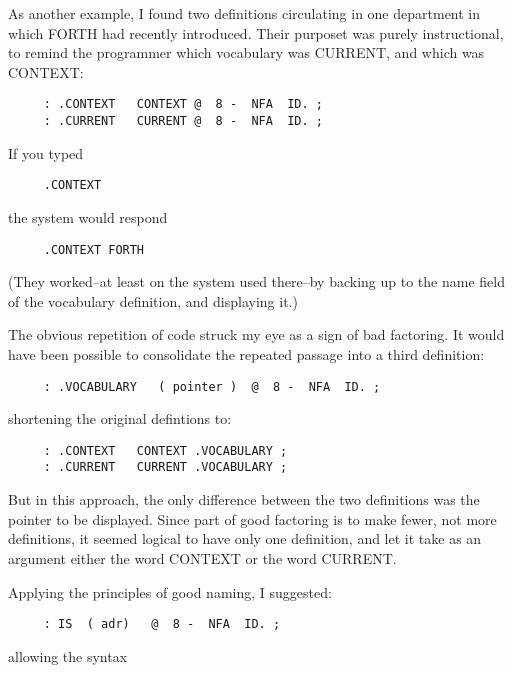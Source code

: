 \documentclass{book}
\begin{document}
As another example, I found two definitions circulating in one department in which FORTH had recently introduced. Their purposet was purely instructional, to remind the programmer which vocabulary was CURRENT, and which was CONTEXT:

\begin{verbatim}
     : .CONTEXT   CONTEXT @  8 -  NFA  ID. ;
     : .CURRENT   CURRENT @  8 -  NFA  ID. ;
\end{verbatim}

\noindent
If you typed

\begin{verbatim}
     .CONTEXT
\end{verbatim}

\noindent
the system would respond


\begin{verbatim}
     .CONTEXT FORTH
\end{verbatim}

\noindent
(They worked--at least on the system used there--by backing up to the name field of the vocabulary definition, and displaying it.)

The obvious repetition of code struck my eye as a sign of bad factoring. It would have been possible to consolidate the repeated passage into a third definition:

\begin{verbatim}
     : .VOCABULARY   ( pointer )  @  8 -  NFA  ID. ;
\end{verbatim}

\noindent
shortening the original defintions to:

\begin{verbatim}
     : .CONTEXT   CONTEXT .VOCABULARY ;
     : .CURRENT   CURRENT .VOCABULARY ;
\end{verbatim}

\noindent
But in this approach, the only difference between the two definitions was the pointer to be displayed. Since part of good factoring is to make fewer, not more definitions, it seemed logical to have only one definition, and let it take as an argument either the word CONTEXT or the word CURRENT.

Applying the principles of good naming, I suggested:

\begin{verbatim}
     : IS  ( adr)   @  8 -  NFA  ID. ;
\end{verbatim}

\noindent
allowing the syntax
\end{document}
